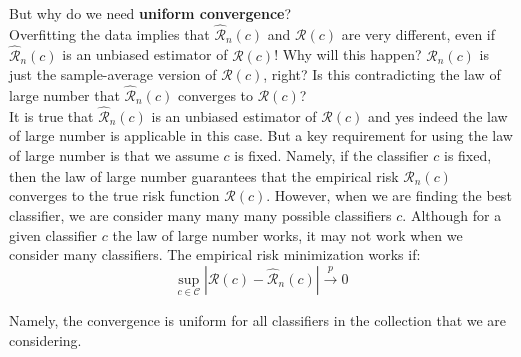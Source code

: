 \documentclass[twoside]{article}
\begin{document}
But why do we need \textbf{uniform convergence}?\\ 
Overfitting the data implies that $\mathcal{\hat{R}}_{n}(c)$ and $\mathcal{R}(c)$ are very different, even if $\mathcal{\hat{R}}_{n}(c)$ is an unbiased
estimator of $\mathcal{R}(c)$!
Why will this happen? $\mathcal{\hat{R}}_{n}(c)$ is just the sample-average version of $\mathcal{R}(c)$, right? Is this contradicting the law
of large number that $\mathcal{\hat{R}}_{n}(c)$ converges to $\mathcal{R}(c)$?\\
It is true that $\mathcal{\hat{R}}_{n}(c)$ is an unbiased estimator of $\mathcal{R}(c)$ and yes indeed the law of large number is applicable
in this case. But a key requirement for using the law of large number is that we assume $c$ is fixed. Namely,
if the classifier $c$ is fixed, then the law of large number guarantees that the empirical risk $\mathcal{\hat{R}}_{n}(c)$ converges
to the true risk function $\mathcal{R}(c)$.
However, when we are finding the best classifier, we are consider many many many possible classifiers $c$.
Although for a given classifier $c$ the law of large number works, it may not work when we consider many
classifiers. The empirical risk minimization works if:
$$\sup_{c \in \mathcal{C}}{|\mathcal{R}(c) - \mathcal{\hat{R}}_{n}(c)|}  \overset{p}{\to} 0$$

Namely, the convergence is uniform for all classifiers in the collection that we are considering.
\end{document}
